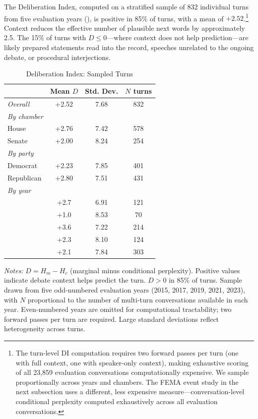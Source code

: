 \documentclass[12pt]{article}
\newcommand{\Hc}{H_c}
\newcommand{\Hm}{H_m}
\newcommand{\DI}{\mathit{D}}
\begin{document}
The Deliberation Index, computed on a stratified sample of 832 individual turns from five evaluation years (), is positive in 85\% of turns, with a mean of $+2.52$.\footnote{The turn-level DI computation requires two forward passes per turn (one with full context, one with speaker-only context), making exhaustive scoring of all 23,859 evaluation conversations computationally expensive. We sample proportionally across years and chambers. The FEMA event study in the next subsection uses a different, less expensive measure---conversation-level conditional perplexity computed exhaustively across all evaluation conversations.} Context reduces the effective number of plausible next words by approximately 2.5. The 15\% of turns with $\DI \leq 0$---where context does not help prediction---are likely prepared statements read into the record, speeches unrelated to the ongoing debate, or procedural interjections.

\begin{table}[H]
\centering
\caption{Deliberation Index: Sampled Turns}
\label{tab:deliberation}
\begin{threeparttable}
\begin{tabular}{lccc}
\toprule
& Mean $\DI$ & Std. Dev. & $N$ turns \\
\midrule
\textit{Overall} & +2.52 & 7.68 & 832 \\
\midrule
\textit{By chamber} \\
\quad House & +2.76 & 7.42 & 578 \\
\quad Senate & +2.00 & 8.24 & 254 \\
\midrule
\textit{By party} \\
\quad Democrat & +2.23 & 7.85 & 401 \\
\quad Republican & +2.80 & 7.51 & 431 \\
\midrule
\textit{By year} \\
\quad 2015 & +2.7 & 6.91 & 121 \\
\quad 2017 & +1.0 & 8.53 & 70 \\
\quad 2019 & +3.6 & 7.22 & 214 \\
\quad 2021 & +2.3 & 8.10 & 124 \\
\quad 2023 & +2.1 & 7.84 & 303 \\
\bottomrule
\end{tabular}
\begin{tablenotes}[flushleft]
\small
\item \textit{Notes:} $\DI = \Hm - \Hc$ (marginal minus conditional perplexity). Positive values indicate debate context helps predict the turn. $\DI > 0$ in 85\% of turns. Sample drawn from five odd-numbered evaluation years (2015, 2017, 2019, 2021, 2023), with $N$ proportional to the number of multi-turn conversations available in each year. Even-numbered years are omitted for computational tractability; two forward passes per turn are required. Large standard deviations reflect heterogeneity across turns.
\end{tablenotes}
\end{threeparttable}
\end{table}
\end{document}

